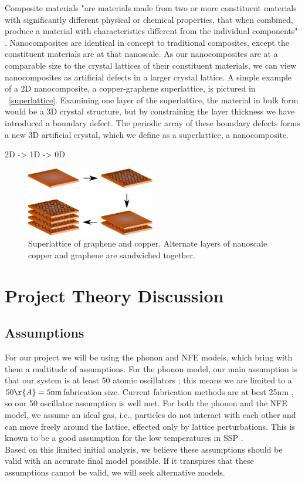 \documentclass[a4paper,10pt,journal]{IEEEtran}
\newcommand{\figref}[2][\figurename~]{#1\ref{#2}}
\begin{document}
Composite materials "are materials made from two or more constituent
materials with significantly different physical or chemical
properties, that when combined, produce a material with
characteristics different from the individual
components" \cite{wiki-composite}. Nanocomposites are identical in
concept to traditional composites, except the constituent materials
are at that nanoscale. As our nanocomposites are at a comparable size
to the crystal lattices of their constituent materials, we can view
nanocomposites as artificial defects in a larger crystal lattice. A
simple example of a 2D nanocomposite, a copper-graphene superlattice,
is pictured in \figref{superlattice}. Examining one layer of the
superlattice, the material in bulk form would be a 3D crystal structure,
but by constraining the layer thickness we have introduced a boundary
defect. The periodic array of these boundary defects forms a new 3D
artificial crystal, which we define as a superlattice, a nanocomposite.

2D -> 1D -> 0D

\begin{figure}
	\centering
	\includegraphics[width=0.5\textwidth]{graphene-superlattice.eps}
	\caption{Superlattice of graphene and copper. Alternate layers of
	nanoscale copper and graphene are sandwiched together.}
\end{figure}

\section{Project Theory Discussion}
\subsection{Assumptions}
For our project we will be using the phonon and \ac{NFE} models, which
bring with them a multitude of assumptions. For the phonon model, our
main assumption is that our system is at least 50 atomic oscillators
\cite{kittel}; this means we are limited to a $50\r{A} = 5
\mathrm{nm}$fabrication size. Current fabrication methods are at best
25nm \cite{minnch-review}, so our 50 oscillator assumption is well met.
For both the phonon and the \ac{NFE} model, we assume an ideal gas,
i.e., particles do not interact with each other and can move freely
around the lattice, effected only by lattice perturbations. This is
known to be a good assumption for the low temperatures in \ac{SSP}
\cite{kittel}.\\
Based on this limited initial analysis, we believe these assumptions
should be valid with an accurate final model possible. If it transpires
that these assumptions cannot be valid, we will seek alternative models.\\
\end{document}
